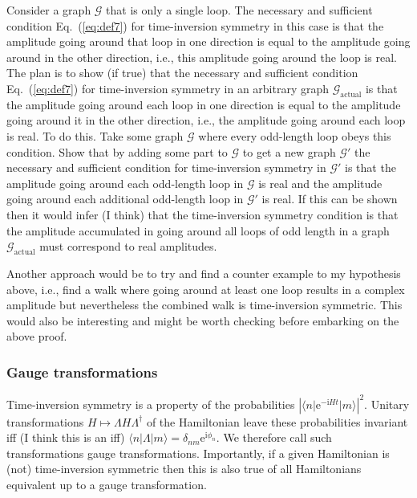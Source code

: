 \documentclass[aps,pra,12pt,nofootinbib,superscriptaddress,longbibliography,showpacs]{revtex4-1}
\newcommand{\yo}[1]{\textcolor{dblue}{\textbf{[}#1\textbf{]}}}
\theoremstyle{plain}
\theoremstyle{definition}
\newcommand{\bra}[1]{\mbox{$\langle #1|$}}
\newcommand{\ket}[1]{\ensuremath{|#1\rangle}}
\newcommand{\eee}{\mathrm{e}}
\newcommand{\GG}{\mathcal{G}}
\newcommand{\ii}{\mathrm{i}}
\newcommand{\eqr}[1]{Eq.~(\ref{#1})}
\begin{document}
Consider a graph $\GG$ that is only a single loop. The necessary and sufficient condition \eqr{eq:def7} for time-inversion symmetry in this case is that the amplitude going around that loop in one direction is equal to the amplitude going around in the other direction, i.e., this amplitude going around the loop is real. The plan is to show (if true) that the necessary and sufficient condition \eqr{eq:def7} for time-inversion symmetry in an arbitrary graph $\GG_{\mathrm{actual}}$ is that the amplitude going around each loop in one direction is equal to the amplitude going around it in the other direction, i.e., the amplitude going around each loop is real. To do this. Take some graph $\GG$ where every odd-length loop obeys this condition. Show that by adding some part to $\GG$ to get a new graph $\GG'$ the necessary and sufficient condition for time-inversion symmetry in $\GG'$ is that the amplitude going around each odd-length loop in $\GG$ is real and the amplitude going around each additional odd-length 
loop in $\GG'$ is real. If this can be shown then it would infer (I think) that the time-inversion symmetry condition is that the amplitude accumulated in going around all loops of odd length in a graph $\GG_{\mathrm{actual}}$ must correspond to real amplitudes.


Another approach would be to try and find a counter example to my hypothesis above, i.e., find a walk where going around at least one loop results in a complex amplitude but nevertheless the combined walk is time-inversion symmetric. This would also be interesting and might be worth checking before embarking on the above proof.

\subsubsection{Gauge transformations}
Time-inversion symmetry is a property of the probabilities $| \bra{n} \eee^{-\ii H t} \ket{m} |^2$. Unitary transformations $H \mapsto \Lambda H \Lambda^\dagger$ of the Hamiltonian leave these probabilities invariant iff (I think this is an iff) $\bra{n} \Lambda \ket{m} = \delta_{nm} \eee^{\ii \phi_n}$. We therefore call such transformations gauge transformations.
Importantly, if a given Hamiltonian is (not) time-inversion symmetric then this is also true of all Hamiltonians equivalent up to a gauge transformation. 
\end{document}
